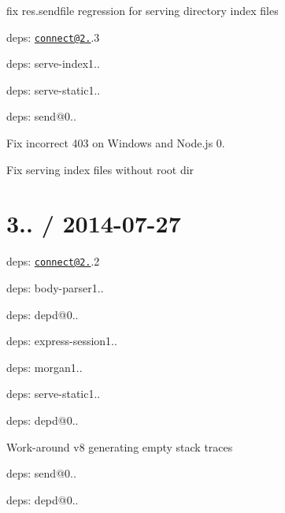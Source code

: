 {\ttfamily 
\begin{DoxyItemize}
\item fix {\ttfamily res.\+sendfile} regression for serving directory index files
\item deps\+: \href{mailto:connect@2.24}{\tt connect@2.}.3
\begin{DoxyItemize}
\item deps\+: serve-\/index1..
\item deps\+: serve-\/static1..
\end{DoxyItemize}
\item deps\+: send@0..
\begin{DoxyItemize}
\item Fix incorrect 403 on Windows and Node.\+js 0.
\item Fix serving index files without root dir
\end{DoxyItemize}
\end{DoxyItemize}}

{\ttfamily \section*{3.. / 2014-\/07-\/27 }}

{\ttfamily }

{\ttfamily 
\begin{DoxyItemize}
\item deps\+: \href{mailto:connect@2.24}{\tt connect@2.}.2
\begin{DoxyItemize}
\item deps\+: body-\/parser1..
\item deps\+: depd@0..
\item deps\+: express-\/session1..
\item deps\+: morgan1..
\item deps\+: serve-\/static1..
\end{DoxyItemize}
\item deps\+: depd@0..
\begin{DoxyItemize}
\item Work-\/around v8 generating empty stack traces
\end{DoxyItemize}
\item deps\+: send@0..
\begin{DoxyItemize}
\item deps\+: depd@0..
\end{DoxyItemize}
\end{DoxyItemize}}

